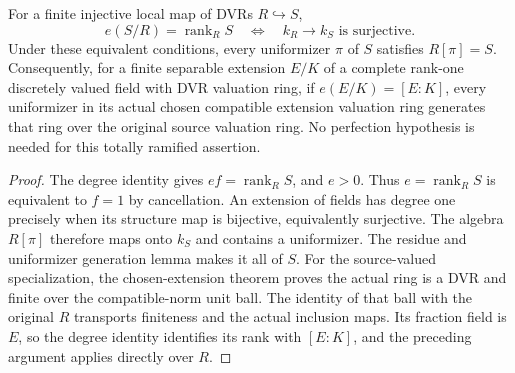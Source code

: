 \begin{lemma}
\label{fw:totally-ramified-uniformizer-generation}
\leanok
For a finite injective local map of DVRs $R\hookrightarrow S$,
\[
 e(S/R)=\operatorname{rank}_R S
 \quad\Longleftrightarrow\quad k_R\longrightarrow k_S\text{ is surjective}.
\]
Under these equivalent conditions, every uniformizer $\pi$ of $S$
satisfies $R[\pi]=S$. Consequently, for a finite separable extension
$E/K$ of a complete rank-one discretely valued field with DVR
valuation ring, if $e(E/K)=[E:K]$, every uniformizer in its actual
chosen compatible extension valuation ring generates that ring over
the original source valuation ring. No perfection hypothesis is
needed for this totally ramified assertion.
\end{lemma}
\begin{proof}
The degree identity gives $ef=\operatorname{rank}_R S$, and $e>0$.
Thus $e=\operatorname{rank}_R S$ is equivalent to $f=1$ by cancellation.
An extension of fields has degree one precisely when its structure
map is bijective, equivalently surjective. The algebra $R[\pi]$
therefore maps onto $k_S$ and contains a uniformizer. The residue
and uniformizer generation lemma makes it all of $S$.
For the source-valued specialization, the chosen-extension theorem
proves the actual ring is a DVR and finite over the compatible-norm
unit ball. The identity of that ball with the original $R$ transports
finiteness and the actual inclusion maps. Its fraction field is $E$,
so the degree identity identifies its rank with $[E:K]$, and the
preceding argument applies directly over $R$.
\end{proof}

